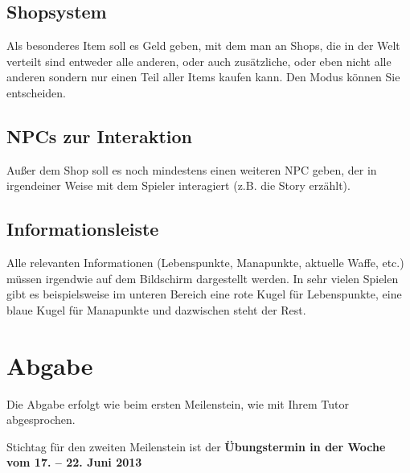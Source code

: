 \documentclass{programmierpraktikum}
\begin{document}
\subsection{Shopsystem}
Als besonderes Item soll es Geld geben, mit dem man an Shops, die in der Welt verteilt sind entweder alle
anderen, oder auch zusätzliche, oder eben nicht alle anderen sondern nur einen Teil aller
Items kaufen kann. Den Modus können Sie entscheiden.
%
\subsection{NPCs zur Interaktion}
Außer dem Shop soll es noch mindestens einen weiteren NPC geben, der in irgendeiner Weise mit dem
Spieler interagiert (z.B. die Story erzählt).
%
\subsection{Informationsleiste}
Alle relevanten Informationen (Lebenspunkte, Manapunkte, aktuelle Waffe, etc.) müssen irgendwie auf
dem Bildschirm dargestellt werden. In sehr vielen Spielen gibt es beispielsweise im unteren Bereich eine rote Kugel
für Lebenspunkte, eine blaue Kugel für Manapunkte und dazwischen steht der Rest.
%
\section{Abgabe}
Die Abgabe erfolgt wie beim ersten Meilenstein, wie mit Ihrem Tutor abgesprochen.

Stichtag für den zweiten Meilenstein ist der \textbf{Übungstermin in der Woche vom 17. -- 22. Juni 2013}
\end{document}

